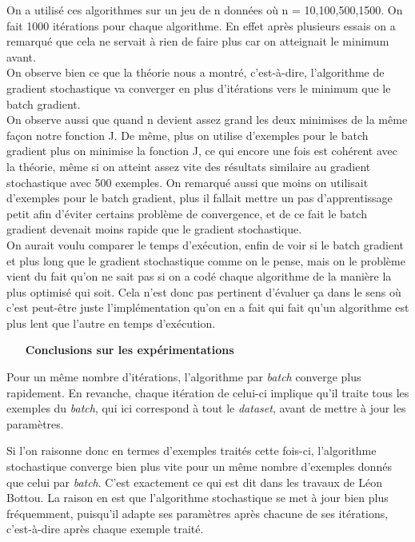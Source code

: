 \documentclass{article}
\begin{document}
On a utilisé ces algorithmes sur un jeu de n données où n = 10,100,500,1500. On fait 1000 itérations pour chaque algorithme. En effet après plusieurs essais on a remarqué que cela ne servait à rien de faire plus car on atteignait le minimum avant.\\
On observe bien ce que la théorie nous a montré, c'est-à-dire, l'algorithme de gradient stochastique va converger en plus d'itérations vers le minimum que le batch gradient.\\
On observe aussi que quand n devient assez grand les deux  minimises de la même façon notre fonction J. De même, plus on utilise d'exemples pour le batch gradient plus on minimise la fonction J, ce qui encore une fois est cohérent avec la théorie, même si on atteint assez vite des résultats similaire au gradient stochastique avec 500 exemples. On remarqué aussi que moins on utilisait d'exemples pour le batch gradient, plus il fallait mettre un pas d'apprentissage petit afin d'éviter certains problème de convergence, et de ce fait le batch gradient devenait moins rapide que le gradient stochastique.\\
On aurait voulu comparer le temps d'exécution, enfin de voir si le batch gradient et plus long que le gradient stochastique comme on le pense, mais on le problème vient du fait qu'on ne sait pas si on a codé chaque algorithme de la manière la plus optimisé qui soit. Cela n'est donc pas pertinent d'évaluer ça dans le sens où c'est peut-être juste l'implémentation qu'on en a fait qui fait qu'un algorithme est plus lent que l'autre en temps d'exécution.
\bigskip

\begin{itemize}
    \item [\textbf{Conclusions sur les expérimentations}]
\end{itemize}
\bigskip

Pour un même nombre d'itérations, l'algorithme par \emph{batch} converge plus rapidement. En revanche, chaque itération de celui-ci implique qu'il traite tous les exemples du \emph{batch}, qui ici correspond à tout le \emph{dataset}, avant de mettre à jour les paramètres.
\bigskip

Si l'on raisonne donc en termes d'exemples traités cette fois-ci, l'algorithme stochastique converge bien plus vite pour un même nombre d'exemples donnés que celui par \emph{batch}. C'est exactement ce qui est dit dans les travaux de Léon Bottou. La raison en est que l'algorithme stochastique se met à jour bien plus fréquemment, puisqu'il adapte ses paramètres après chacune de ses itérations, c'est-à-dire après chaque exemple traité. 
\bigskip
\end{document}
